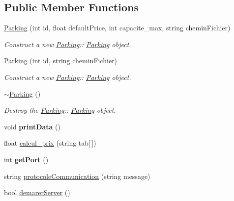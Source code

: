 \subsection*{Public Member Functions}
\begin{DoxyCompactItemize}
\item 
\mbox{\hyperlink{class_parking_a71be192e206305ba76ef2c96cd5bbe5a}{Parking}} (int id, float default\+Price, int capacite\+\_\+max, string chemin\+Fichier)
\begin{DoxyCompactList}\small\item\em Construct a new \mbox{\hyperlink{class_parking}{Parking}}\+:\+: \mbox{\hyperlink{class_parking}{Parking}} object. \end{DoxyCompactList}\item 
\mbox{\hyperlink{class_parking_a300004ddbc70c562488cf3f933d5cfb3}{Parking}} (int id, string chemin\+Fichier)
\begin{DoxyCompactList}\small\item\em Construct a new \mbox{\hyperlink{class_parking}{Parking}}\+:\+: \mbox{\hyperlink{class_parking}{Parking}} object. \end{DoxyCompactList}\item 
\mbox{\label{class_parking_aba04e48c6e34ae0c1eaee8f3d670e8fb}} 
\mbox{\hyperlink{class_parking_aba04e48c6e34ae0c1eaee8f3d670e8fb}{$\sim$\+Parking}} ()
\begin{DoxyCompactList}\small\item\em Destroy the \mbox{\hyperlink{class_parking}{Parking}}\+:\+: \mbox{\hyperlink{class_parking}{Parking}} object. \end{DoxyCompactList}\item 
\mbox{\label{class_parking_acddc5b3da5d2769385affe3aad116cb3}} 
void {\bfseries print\+Data} ()
\item 
float \mbox{\hyperlink{class_parking_a41df7b6f534723a56c36f7c06d336f1b}{calcul\+\_\+prix}} (string tab\mbox{[}$\,$\mbox{]})
\item 
\mbox{\label{class_parking_a95abbf61891ce84164c19e642756b25b}} 
int {\bfseries get\+Port} ()
\item 
string \mbox{\hyperlink{class_parking_a4b02969c773d1f1cbe8b895608124a49}{protocole\+Communication}} (string message)
\item 
bool \mbox{\hyperlink{class_parking_a28bcb84c5a6f26d13646253fd69471dd}{demarer\+Server}} ()
\end{DoxyCompactItemize}


